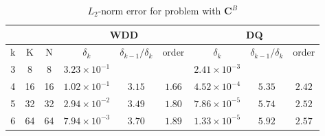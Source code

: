 \documentclass[../main.tex]{subfiles}
\begin{document}
\begin{table}[!htb]
  \centering
  \caption{$L_2$-norm error for problem with $\boldsymbol{C}^B$}
  \label{tab:L2_boltzmann}
  \begin{tabular}{ccc|ccc|ccc}
  \toprule[2pt]
  \multicolumn{3}{c|}{} & \multicolumn{3}{c|}{WDD} & \multicolumn{3}{c}{DQ} \\ \hline
  \multicolumn{1}{c}{k}            & \multicolumn{1}{c}{K}                       & \multicolumn{1}{c|}{N}  
  & \multicolumn{1}{c}{$\delta_k$} & \multicolumn{1}{c}{$\delta_{k-1}/\delta_k$} & \multicolumn{1}{c|}{order}    
  & \multicolumn{1}{c}{$\delta_k$} & \multicolumn{1}{c}{$\delta_{k-1}/\delta_k$} & \multicolumn{1}{c}{order}
  \\ \midrule[2pt]
  \multicolumn{1}{c}{3}          & \multicolumn{1}{c}{8}        & \multicolumn{1}{c|}{8}        
  & \multicolumn{1}{c}{$3.23\times 10^{-1}$} & \multicolumn{1}{c}{}         & \multicolumn{1}{c|}{} 
  & \multicolumn{1}{c}{$2.41\times 10^{-3}$} & \multicolumn{1}{c}{}         & \multicolumn{1}{c}{} \\
  \multicolumn{1}{c}{4}          & \multicolumn{1}{c}{16}       & \multicolumn{1}{c|}{16}      
  & \multicolumn{1}{c}{$1.02\times 10^{-1}$} & \multicolumn{1}{c}{$3.15$} & \multicolumn{1}{c|}{$1.66$} 
  & \multicolumn{1}{c}{$4.52\times 10^{-4}$} & \multicolumn{1}{c}{$5.35$} & \multicolumn{1}{c}{$2.42$} \\
  \multicolumn{1}{c}{5}          & \multicolumn{1}{c}{32}       & \multicolumn{1}{c|}{32} 
  & \multicolumn{1}{c}{$2.94\times 10^{-2}$} & \multicolumn{1}{c}{$3.49$} & \multicolumn{1}{c|}{$1.80$} 
  & \multicolumn{1}{c}{$7.86\times 10^{-5}$} & \multicolumn{1}{c}{$5.74$} & \multicolumn{1}{c}{$2.52$} \\
  \multicolumn{1}{c}{6}          & \multicolumn{1}{c}{64}       & \multicolumn{1}{c|}{64} 
  & \multicolumn{1}{c}{$7.94\times 10^{-3}$} & \multicolumn{1}{c}{$3.70$} & \multicolumn{1}{c|}{$1.89$} 
  & \multicolumn{1}{c}{$1.33\times 10^{-5}$} & \multicolumn{1}{c}{$5.92$} & \multicolumn{1}{c}{$2.57$} \\
  \bottomrule[2pt]
  \end{tabular}
\end{table}
\end{document}
